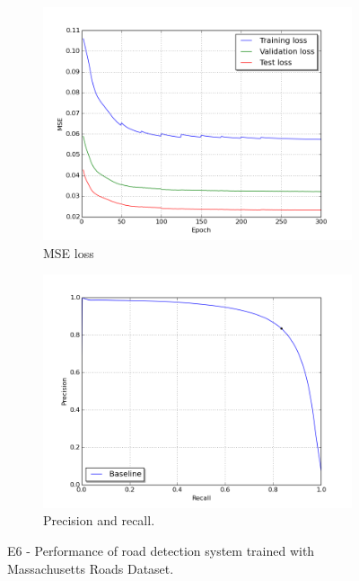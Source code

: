 \begin{figure}
\begin{subfigure}{0.48\textwidth}
\includegraphics[width=\linewidth]{figs/E6/E6_lc_loss.png}
\caption{MSE loss} \label{fig:E6_performance_mass_lc}
\end{subfigure}
\hspace*{\fill} %
\begin{subfigure}{0.48\textwidth}
\includegraphics[width=\linewidth]{figs/E6/E6_pr.png}
\caption{Precision and recall.} \label{fig:E6_performance_mass_pr}
\end{subfigure}
\hspace*{\fill} %
\caption{E6 - Performance of road detection system trained with Massachusetts Roads Dataset.} \label{fig:E6_performance_mass}
\end{figure}

